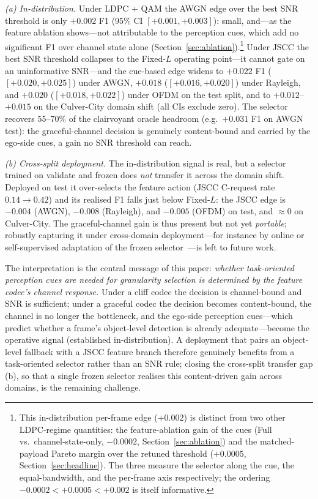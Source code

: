 \documentclass[journal]{IEEEtran}
\begin{document}
\emph{(a) In-distribution.} Under LDPC + QAM the AWGN edge over the best SNR threshold is only
$+0.002$ F1 ($95\%$ CI $[+0.001,+0.003]$): small, and---as the feature ablation shows---not
attributable to the perception cues, which add no significant F1 over channel state alone
(Section~\ref{sec:ablation}).\footnote{This in-distribution per-frame edge ($+0.002$) is
distinct from two other LDPC-regime quantities: the feature-ablation gain of the cues (Full
vs.\ channel-state-only, $-0.0002$, Section~\ref{sec:ablation}) and the matched-payload Pareto
margin over the retuned threshold ($+0.0005$, Section~\ref{sec:headline}). The three measure
the selector along the cue, the equal-bandwidth, and the per-frame axis respectively; the
ordering $-0.0002 < +0.0005 < +0.002$ is itself informative.} Under JSCC the best SNR threshold
collapses to the Fixed-$L$ operating point---it cannot gate on an uninformative SNR---and the
cue-based edge widens to $+0.022$ F1 ($[+0.020,+0.025]$) under AWGN, $+0.018$
($[+0.016,+0.020]$) under Rayleigh, and $+0.020$ ($[+0.018,+0.022]$) under OFDM on the test
split, and to $+0.012$--$+0.015$ on the Culver-City domain shift (all CIs exclude zero). The
selector recovers $55$--$70\%$ of the clairvoyant oracle headroom (e.g.\ $+0.031$ F1 on AWGN
test): the graceful-channel decision is genuinely content-bound and carried by the ego-side
cues, a gain no SNR threshold can reach.

\emph{(b) Cross-split deployment.} The in-distribution signal is real, but a selector trained on
validate and frozen does \emph{not} transfer it across the domain shift. Deployed on test it
over-selects the feature action (JSCC C-request rate $0.14\!\to\!0.42$) and its realised F1
falls just below Fixed-$L$: the JSCC edge is $-0.004$ (AWGN), $-0.008$ (Rayleigh), and $-0.005$
(OFDM) on test, and ${\approx}0$ on Culver-City. The graceful-channel gain is thus present but
not yet \emph{portable}; robustly capturing it under cross-domain deployment---for instance by
online or self-supervised adaptation of the frozen selector~\cite{liu2024ssaw}---is left to future work.

The interpretation is the central message of this paper: \emph{whether task-oriented
perception cues are needed for granularity selection is determined by the feature codec's
channel response.} Under a cliff codec the decision is channel-bound and SNR is sufficient;
under a graceful codec the decision becomes content-bound, the channel is no longer the
bottleneck, and the ego-side perception cues---which predict whether a frame's object-level
detection is already adequate---become the operative signal (established in-distribution). A
deployment that pairs an object-level fallback with a JSCC feature branch therefore genuinely
benefits from a task-oriented selector rather than an SNR rule; closing the cross-split transfer
gap (b), so that a single frozen selector realises this content-driven gain across domains,
is the remaining challenge.
\end{document}

